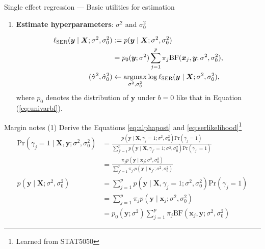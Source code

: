\documentclass[10pt]{beamer}
\begin{document}
\begin{frame}[allowframebreaks]{Single effect regression --- \normalsize Basic utilities for estimation}
\begin{enumerate}
        Let $\bm{r}=(r_1,\cdots,r_p)$ be the indices such that $\alpha_{r_1}>\cdots>\alpha_{r_p}$, and 
        let $S_k$ be the cumulative sum of the $k$ largest PIPs
        $S_k:=\sum_{j=1}^k\alpha_{r_j}$,
        then
        \begin{gather}
            \text{CS}(\bm{\alpha};\rho) \gets \{
            r_1,\cdots,r_{k^*}:k^*=\inf\{k:S_k\geq \rho\}
            \}
        \end{gather}
        
        \medskip
        
        \item \textbf{Estimate hyperparameters}: $\sigma^2$ and $\sigma_0^2$
        
        \begin{align}
            \ell_{\text{SER}}(\bm{y}\mid\bm{X};\sigma^2,\sigma_0^2) 
            & := p(\bm{y}\mid\bm{X};\sigma^2,\sigma_0^2) \notag \\
            & = p_0(\bm{y}; \sigma^2)\sum_{j=1}^p\pi_j\text{BF}(\bm{x}_j,\bm{y};\sigma^2,\sigma_0^2), \label{eq:serlikelihood}\\
            (\hat{\sigma}^2,\hat{\sigma}_0^2) & \gets \operatorname*{\arg\!max}_{\sigma^2,\sigma_0^2}
            \log \ell_{\text{SER}}(\bm{y}\mid\bm{X};\sigma^2,\sigma_0^2) \label{eq:sielikelihood},
        \end{align}
        where $p_0$ denotes the distribution of $\bm{y}$ under $b=0$ like that in Equation (\ref{eq:univarbf}).
    \end{enumerate}
    
\end{frame}

\begin{frame}{Margin notes (1)}
    Derive the Equations \eqref{eq:alphapost} and \eqref{eq:serlikelihood}\footnote{Learned from STAT5050}
    {\small
    \begin{align}
        \text{Pr}(\gamma_j=1\mid\bm{X},\bm{y};\sigma^2,\sigma_0^2)
        & = \frac{p(\bm{y}\mid\bm{X},\gamma_j=1;\sigma^2,\sigma_0^2)\text{Pr}(\gamma_j=1)}
        {\sum_{j'=1}^pp(\bm{y}\mid\bm{X},\gamma_{j'}=1;\sigma^2,\sigma_0^2)\text{Pr}(\gamma_{j'}=1)}\\
        & = \frac{\pi_jp(\bm{y}\mid\bm{x}_j;\sigma^2,\sigma_0^2)}{\sum_{j'=1}^p \pi_{j'}p(\bm{y}\mid\bm{x}_{j'};\sigma^2,\sigma_0^2)} \\
        p(\bm{y}\mid\bm{X};\sigma^2,\sigma_0^2) 
        & = \sum_{j=1}^p p(\bm{y}\mid\bm{X},\gamma_j=1;\sigma^2,\sigma_0^2)\text{Pr}(\gamma_j=1) \\
        & = \sum_{j=1}^p \pi_{j}p(\bm{y}\mid\bm{x}_j;\sigma^2,\sigma_0^2) \\
        & = p_0(\bm{y}; \sigma^2)\sum_{j=1}^p\pi_j\text{BF}(\bm{x}_j,\bm{y};\sigma^2,\sigma_0^2)
        \end{align}}
\end{frame}
\end{document}
